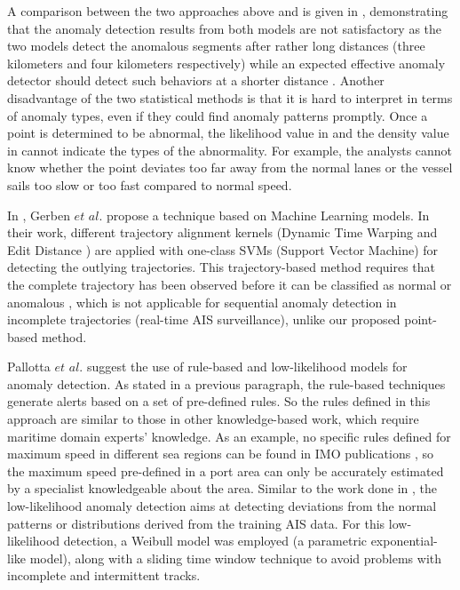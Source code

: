 \documentclass[12pt,glossary]{dalcsthesis}
\begin{document}
A comparison between the two approaches above \cite{gmm} and \cite{kde} is given in \cite{comparison}, demonstrating that the anomaly detection results from both models are not satisfactory %
as the two models detect the anomalous segments after rather long distances (three kilometers and four kilometers respectively) while an expected effective anomaly detector should detect such behaviors at a shorter distance \cite{comparison}. %
Another disadvantage of the two statistical methods is that it is hard to interpret in terms of anomaly types, even if they could find anomaly patterns promptly. Once a point is determined to be abnormal, the likelihood value in \cite{gmm} and the density value in \cite{kde} cannot indicate the types of the abnormality. For example, the analysts cannot know whether the point deviates too far away from the normal lanes or the vessel sails too slow or too fast compared to normal speed.




In \cite{Gerben}, Gerben $et$ $al.$ propose a technique based on Machine Learning models. In their work, different trajectory alignment kernels (Dynamic Time Warping \cite{dtw} and Edit Distance \cite{edit_distance}) are applied with one-class SVMs (Support Vector Machine) \cite{svm} for detecting the outlying trajectories. This trajectory-based method requires that the complete trajectory has been observed before it can be classified as normal or anomalous \cite{phdthesis}, which is not applicable for sequential anomaly detection in incomplete trajectories (real-time AIS surveillance), unlike our proposed point-based method.



Pallotta $et$ $al.$ \cite{PallottaFramework} suggest the use of rule-based and low-likelihood models for anomaly detection. As stated in a previous paragraph, the rule-based techniques generate alerts based on a set of pre-defined rules. So the rules defined in this approach are similar to those in other knowledge-based work, which require maritime domain experts' knowledge. As an example,  no specific rules defined for maximum speed in different sea regions can be found in IMO publications \cite{tss}\cite{anabook}, so the maximum speed pre-defined in a port area can only be accurately estimated by a specialist knowledgeable about the area. Similar to the work done in \cite{gmm}, the low-likelihood anomaly detection aims at detecting deviations from the normal patterns or distributions derived from the training AIS data. For this low-likelihood detection, a Weibull model was employed (a parametric exponential-like model), along with a sliding time window technique to avoid problems with incomplete and intermittent tracks.
\end{document}

